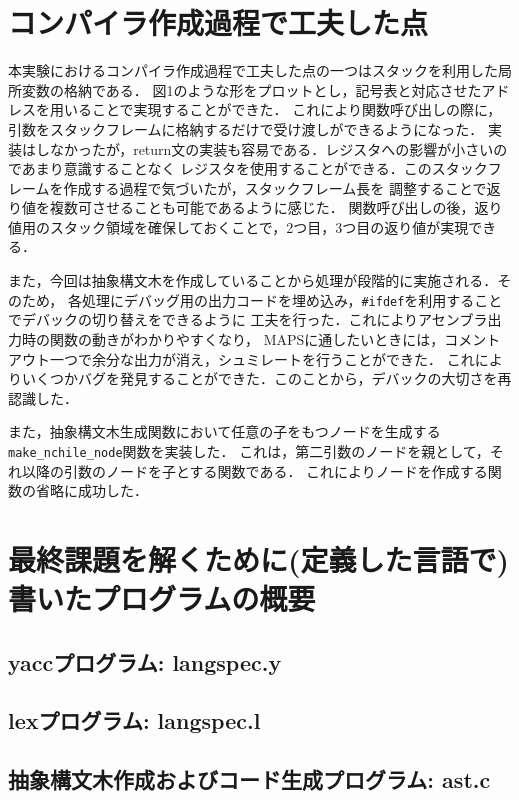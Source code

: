 \documentclass[a4paper,11pt]{jarticle}
\begin{document}
{%
\section{コンパイラ作成過程で工夫した点}
本実験におけるコンパイラ作成過程で工夫した点の一つはスタックを利用した局所変数の格納である．
図1のような形をプロットとし，記号表と対応させたアドレスを用いることで実現することができた．
これにより関数呼び出しの際に，引数をスタックフレームに格納するだけで受け渡しができるようになった．
実装はしなかったが，return文の実装も容易である．レジスタへの影響が小さいのであまり意識することなく
レジスタを使用することができる．このスタックフレームを作成する過程で気づいたが，スタックフレーム長を
調整することで返り値を複数可させることも可能であるように感じた．
関数呼び出しの後，返り値用のスタック領域を確保しておくことで，2つ目，3つ目の返り値が実現できる．

また，今回は抽象構文木を作成していることから処理が段階的に実施される．そのため，
各処理にデバッグ用の出力コードを埋め込み，\verb|#ifdef|を利用することでデバックの切り替えをできるように
工夫を行った．これによりアセンブラ出力時の関数の動きがわかりやすくなり，
MAPSに通したいときには，コメントアウト一つで余分な出力が消え，シュミレートを行うことができた．
これによりいくつかバグを発見することができた．このことから，デバックの大切さを再認識した．

また，抽象構文木生成関数において任意の子をもつノードを生成する\verb|make_nchile_node|関数を実装した．
これは，第二引数のノードを親として，それ以降の引数のノードを子とする関数である．
これによりノードを作成する関数の省略に成功した．

\section{最終課題を解くために(定義した言語で)書いたプログラムの概要}
\subsection{yaccプログラム: langspec.y}
\subsection{lexプログラム: langspec.l}
\subsection{抽象構文木作成およびコード生成プログラム: ast.c}
}
\end{document}
